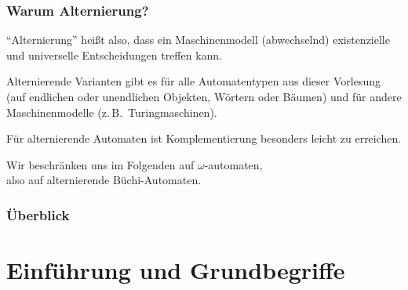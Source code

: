   \begin{frame}
    \frametitle{Warum Alternierung?}
    
    \begin{Itemize}
      \item
        "`Alternierung"' heißt also, dass ein Maschinenmodell (abwechselnd)
        existenzielle und universelle Entscheidungen treffen kann.
        \parI
      \item
        Alternierende Varianten gibt es für alle Automatentypen aus dieser Vorlesung
        (auf endlichen oder unendlichen Objekten, Wörtern oder Bäumen)
        und für andere Maschinenmodelle (z.\,B.\ Turingmaschinen).
        \parI
      \item
        Für alternierende Automaten ist Komplementierung besonders leicht zu erreichen.
        \parI
      \item
        Wir beschränken uns im Folgenden auf $\omega$-automaten, \\
        also auf alternierende Büchi-Automaten.
    \end{Itemize}
    
  \end{frame}
    
  \begin{frame}
  \frametitle{Überblick}
    \tableofcontents
  \end{frame}

  \section[Einführung]{Einführung und Grundbegriffe}

